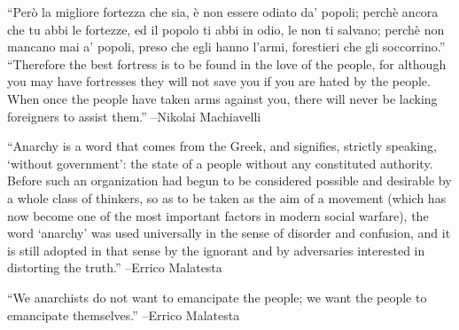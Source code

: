 \documentclass{article}%
\begin{document}
\linebreak%
\vspace{1mm}%
\begin{minipage}{\textwidth}%
\flushleft%
“Però la migliore fortezza che sia, è non essere odiato da' popoli; perchè ancora che tu abbi le fortezze, ed il popolo ti abbi in odio, le non ti salvano; perchè non mancano mai a’ popoli, preso che egli hanno l’armi, forestieri che gli soccorrino.”%
\linebreak%
\vspace{1mm}%
“Therefore the best fortress is to be found in the love of the people, for although you may have fortresses they will not save you if you are hated by the people. When once the people have taken arms against you, there will never be lacking foreigners to assist them.”%
\linebreak%
–Nikolai Machiavelli%
\linebreak%
\vspace{1mm}%
\end{minipage}%
\linebreak%
\vspace{1mm}%
\begin{minipage}{\textwidth}%
\flushleft%
“Anarchy is a word that comes from the Greek, and signifies, strictly speaking, ‘without government’: the state of a people without any constituted authority. Before such an organization had begun to be considered possible and desirable by a whole class of thinkers, so as to be taken as the aim of a movement (which has now become one of the most important factors in modern social warfare), the word ‘anarchy’ was used universally in the sense of disorder and confusion, and it is still adopted in that sense by the ignorant and by adversaries interested in distorting the truth.”%
\linebreak%
\vspace{1mm}%
–Errico Malatesta%
\linebreak%
\vspace{1mm}%
\end{minipage}%
\linebreak%
\vspace{1mm}%
\begin{minipage}{\textwidth}%
\flushleft%
“We anarchists do not want to emancipate the people; we want the people to emancipate themselves.”%
\linebreak%
\vspace{1mm}%
–Errico Malatesta%
\linebreak%
\vspace{1mm}%
\end{minipage}%
\end{document}
